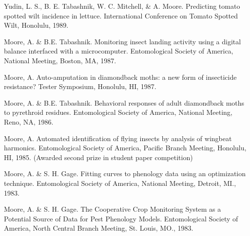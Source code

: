\documentclass[12pt,english]{simplecv}
\begin{document}
\begin{thebibliography}{999}
Yudin, L. S., B. E. Tabashnik, W. C. Mitchell, \&
A. Moore. Predicting tomato spotted wilt incidence in lettuce. International
Conference on Tomato Spotted Wilt, Honolulu, 1989. 

Moore, A. \& B.E. Tabashnik. Monitoring insect landing
activity using a digital balance interfaced with a microcomputer.
Entomological Society of America, National Meeting, Boston, MA, 1987. 

Moore, A. Auto-amputation in diamondback moths: a
new form of insecticide resistance? Tester Symposium, Honolulu, HI,
1987. 

Moore, A. \& B.E. Tabashnik. Behavioral responses
of adult diamondback moths to pyrethroid residues. Entomological Society
of America, National Meeting, Reno, NA, 1986. 

Moore, A. Automated identification of flying insects
by analysis of wingbeat harmonics. Entomological Society of America,
Pacific Branch Meeting, Honolulu, HI, 1985. (Awarded second prize
in student paper competition) 

Moore, A. \& S. H. Gage. Fitting curves to phenology
data using an optimization technique. Entomological Society of America,
National Meeting, Detroit, MI., 1983. 

Moore, A. \& S. H. Gage. The Cooperative Crop Monitoring
System as a Potential Source of Data for Pest Phenology Models. Entomological
Society of America, North Central Branch Meeting, St. Louis, MO.,
1983. 
\end{thebibliography}
\end{document}
